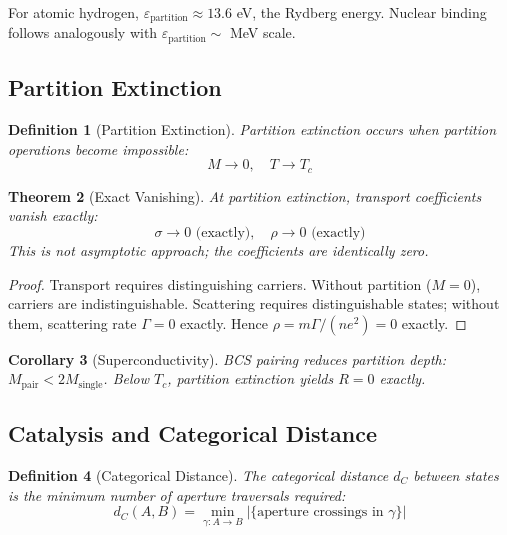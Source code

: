 \documentclass[twocolumn,amsmath,amssymb,aps,prl,superscriptaddress]{revtex4-2}
\newtheorem{theorem}{Theorem}[section]
\newtheorem{corollary}[theorem]{Corollary}
\newtheorem{definition}[theorem]{Definition}
\newcommand{\Mpart}{M}
\begin{document}
For atomic hydrogen, $\varepsilon_{\text{partition}} \approx 13.6$ eV, the Rydberg energy. Nuclear binding follows analogously with $\varepsilon_{\text{partition}} \sim$ MeV scale.

\subsection{Partition Extinction}

\begin{definition}[Partition Extinction]
Partition extinction occurs when partition operations become impossible:
\begin{equation}
\Mpart \to 0, \quad T \to T_c
\end{equation}
\end{definition}

\begin{theorem}[Exact Vanishing]
\label{thm:exact}
At partition extinction, transport coefficients vanish \emph{exactly}:
\begin{equation}
\boxed{\sigma \to 0 \text{ (exactly)}, \quad \rho \to 0 \text{ (exactly)}}
\end{equation}
This is not asymptotic approach; the coefficients are identically zero.
\end{theorem}

\begin{proof}
Transport requires distinguishing carriers. Without partition ($\Mpart = 0$), carriers are indistinguishable. Scattering requires distinguishable states; without them, scattering rate $\Gamma = 0$ exactly. Hence $\rho = m\Gamma/(ne^2) = 0$ exactly.
\end{proof}

\begin{corollary}[Superconductivity]
BCS pairing reduces partition depth: $\Mpart_{\text{pair}} < 2\Mpart_{\text{single}}$. Below $T_c$, partition extinction yields $R = 0$ exactly.
\end{corollary}

\subsection{Catalysis and Categorical Distance}

\begin{definition}[Categorical Distance]
The categorical distance $d_C$ between states is the minimum number of aperture traversals required:
\begin{equation}
d_C(A, B) = \min_{\gamma: A \to B} |\{\text{aperture crossings in } \gamma\}|
\end{equation}
\end{definition}
\end{document}
